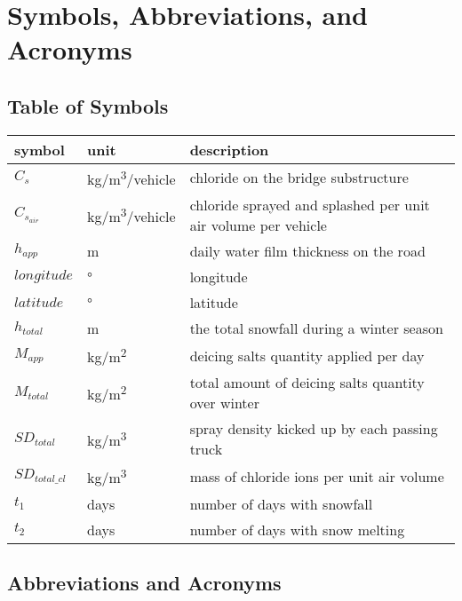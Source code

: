 \documentclass[12pt, titlepage]{article}
\begin{document}
\newpage

\section{Symbols, Abbreviations, and Acronyms}


\subsection{Table of Symbols}
\noindent \begin{tabular}{l l p{12cm}} \toprule
\textbf{symbol} & \textbf{unit} & \textbf{description}\\
\midrule 
$C_s$ & \si{kg/m^3/vehicle} & chloride on the bridge substructure\\
$C_{s_{air}}$ & \si{kg/m^3/vehicle} & chloride sprayed and splashed per unit air volume per vehicle\\
$h_{app}$ & \si{m} & daily water film thickness on the road\\
$longitude$ & \si[per-mode=symbol] {\degree} & longitude \\
$latitude$ & \si[per-mode=symbol] {\degree} & latitude \\
$h_{total}$ & \si{m} & the total snowfall during a winter season\\
$M_{app}$ & \si{kg/m^2} & deicing salts quantity applied per day\\
$M_{total}$ & \si{kg/m^2} & total amount of deicing salts quantity over winter\\
$SD_{total}$ & \si{kg/m^{3}} & spray density kicked up by each passing truck\\
$SD_{total\_cl}$ & \si{kg/m^3} & mass of chloride ions per unit air volume\\
$t_1$ & days & number of days with snowfall\\
$t_2$ & days & number of days with snow melting\\
\bottomrule
\end{tabular}



\subsection{Abbreviations and Acronyms}
\end{document}
